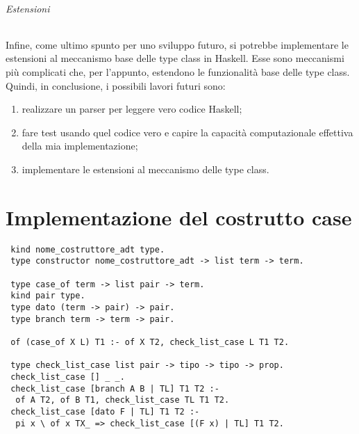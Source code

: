 \documentclass[12pt,a4paper,openright,twoside]{report}
\begin{document}
\subparagraph{Estensioni}
Infine, come ultimo spunto per uno sviluppo futuro, si potrebbe implementare le estensioni al meccanismo base delle type class in Haskell. Esse sono meccanismi più complicati che, per l'appunto, estendono le funzionalità base delle type class.\\

Quindi, in conclusione, i possibili lavori futuri sono:
\begin{enumerate}
 \item realizzare un parser per leggere vero codice Haskell;
 \item fare test usando quel codice vero e capire la capacità computazionale effettiva della mia implementazione;
 \item implementare le estensioni al meccanismo delle type class.
\end{enumerate}

\clearpage{\pagestyle{empty}\cleardoublepage}		%


\appendix   %



\chapter{Implementazione del costrutto case}   %
\begin{verbatim}
 kind nome_costruttore_adt type.
 type constructor nome_costruttore_adt -> list term -> term.

 type case_of term -> list pair -> term.
 kind pair type.
 type dato (term -> pair) -> pair.
 type branch term -> term -> pair.

 of (case_of X L) T1 :- of X T2, check_list_case L T1 T2.

 type check_list_case list pair -> tipo -> tipo -> prop.
 check_list_case [] _ _.
 check_list_case [branch A B | TL] T1 T2 :-
  of A T2, of B T1, check_list_case TL T1 T2.
 check_list_case [dato F | TL] T1 T2 :-
  pi x \ of x TX_ => check_list_case [(F x) | TL] T1 T2.
\end{verbatim}

\clearpage{\pagestyle{empty}\cleardoublepage}		%


\end{document}
